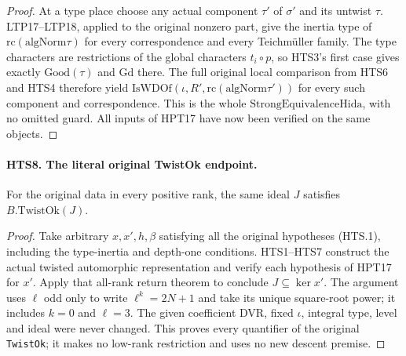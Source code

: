 \begin{proof}
At a type place choose any actual component $\tau'$ of
$\sigma'$ and its untwist $\tau$.  LTP17--LTP18, applied to
the original nonzero part, give the inertia type of
$\mathrm{rc}(\mathrm{algNorm}\tau)$ for every correspondence
and every Teichm\"uller family.  The type characters are
restrictions of the global characters $t_i\circ p$, so HTS3's
first case gives exactly $\mathrm{Good}(\tau)$ and
$\mathrm{Gd}$ there.  The full original local comparison
from HTS6 and HTS4 therefore yield
$\mathrm{IsWDOf}(\iota,R',\mathrm{rc}(\mathrm{algNorm}\tau'))$
for every such component and correspondence.  This is the
whole $\mathrm{StrongEquivalenceHida}$, with no omitted guard.
All inputs of HPT17 have now been verified on the same objects.
\end{proof}

\paragraph{HTS8. The literal original TwistOk endpoint.}
\label{claim:HTS8}
For the original data in every positive rank, the same ideal
$J$ satisfies $B.\mathrm{TwistOk}(J)$.
\begin{proof}
Take arbitrary $x,x',h,\beta$ satisfying all the original
hypotheses (HTS.1), including the type-inertia and depth-one
conditions.  HTS1--HTS7 construct the actual twisted automorphic
representation and verify each hypothesis of HPT17 for $x'$.
Apply that all-rank return theorem to conclude
$J\subseteq\ker x'$.  The argument uses $\ell$ odd only to
write $\ell^k=2N+1$ and take its unique square-root power;
it includes $k=0$ and $\ell=3$.  The given coefficient DVR,
fixed $\iota$, integral type, level and ideal were never changed.
This proves every quantifier of the original \texttt{TwistOk};
it makes no low-rank restriction and uses no new descent premise.
\end{proof}
